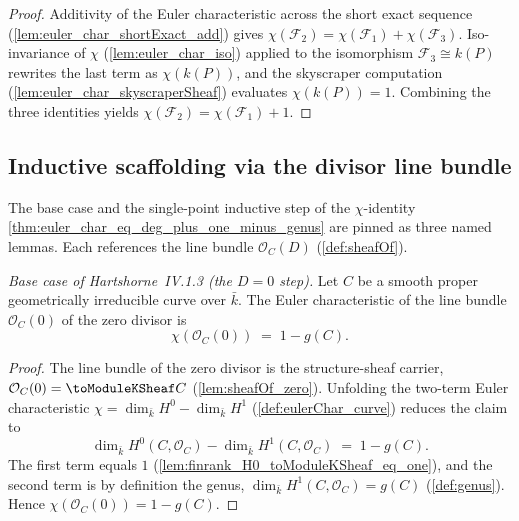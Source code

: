 \begin{proof}
  Additivity of the Euler characteristic across the short exact sequence
  (\cref{lem:euler_char_shortExact_add}) gives
  \(\chi(\mathcal F_2) = \chi(\mathcal F_1) + \chi(\mathcal F_3)\).
  Iso-invariance of \(\chi\) (\cref{lem:euler_char_iso}) applied to the
  isomorphism \(\mathcal F_3 \cong k(P)\) rewrites the last term as
  \(\chi(k(P))\), and the skyscraper computation
  (\cref{lem:euler_char_skyscraperSheaf}) evaluates \(\chi(k(P)) = 1\).
  Combining the three identities yields
  \(\chi(\mathcal F_2) = \chi(\mathcal F_1) + 1\).
\end{proof}

\subsection*{Inductive scaffolding via the divisor line bundle}

The base case and the single-point inductive step of the
\(\chi\)-identity \cref{thm:euler_char_eq_deg_plus_one_minus_genus} are
pinned as three named lemmas. Each references the line bundle
\(\mathcal O_C(D)\) (\cref{def:sheafOf}).

\begin{lemma}
  \label{lem:euler_char_sheafOf_zero}
  \textit{Base case of Hartshorne~IV.1.3 (the \(D = 0\) step).}
  Let \(C\) be a smooth proper geometrically irreducible curve over
  \(\bar k\). The Euler characteristic of the line bundle
  \(\mathcal O_C(0)\) of the zero divisor is
  \[
    \chi(\mathcal O_C(0)) \;=\; 1 - g(C).
  \]
\end{lemma}

\begin{proof}
  The line bundle of the zero divisor is the structure-sheaf carrier,
  \(\mathcal O_C(0) = \toModuleKSheaf C\) (\cref{lem:sheafOf_zero}).
  Unfolding the two-term Euler characteristic
  \(\chi = \dim_{\bar k} H^0 - \dim_{\bar k} H^1\)
  (\cref{def:eulerChar_curve}) reduces the claim to
  \[
    \dim_{\bar k} H^0(C, \mathcal O_C)
    - \dim_{\bar k} H^1(C, \mathcal O_C) \;=\; 1 - g(C).
  \]
  The first term equals \(1\)
  (\cref{lem:finrank_H0_toModuleKSheaf_eq_one}), and the second term is by
  definition the genus, \(\dim_{\bar k} H^1(C, \mathcal O_C) = g(C)\)
  (\cref{def:genus}). Hence \(\chi(\mathcal O_C(0)) = 1 - g(C)\).
\end{proof}

